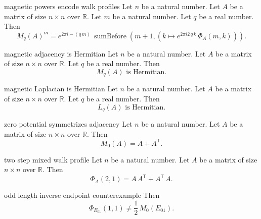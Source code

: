 \begin{cleanresult}{magnetic powers encode walk profiles}
Let $n$ be a natural number.
Let $A$ be a matrix of size $n\times n$ over $\mathbb{R}$.
Let $m$ be a natural number.
Let $q$ be a real number.
Then \[{M_{q}(A)}^{m} = e^{2\pi i -(q \, m)} \, \operatorname{sumBefore}(m + 1,\left(k \mapsto e^{2\pi i 2 \, q \, k} \, \Phi_{A}(m,k)\right)).\]
\par{}
\end{cleanresult}

\begin{cleanresult}{magnetic adjacency is Hermitian}
Let $n$ be a natural number.
Let $A$ be a matrix of size $n\times n$ over $\mathbb{R}$.
Let $q$ be a real number.
Then \[M_{q}(A)\text{ is Hermitian}.\]
\par{}
\end{cleanresult}

\begin{cleanresult}{magnetic Laplacian is Hermitian}
Let $n$ be a natural number.
Let $A$ be a matrix of size $n\times n$ over $\mathbb{R}$.
Let $q$ be a real number.
Then \[L_{q}(A)\text{ is Hermitian}.\]
\end{cleanresult}

\begin{cleanresult}{zero potential symmetrizes adjacency}
Let $n$ be a natural number.
Let $A$ be a matrix of size $n\times n$ over $\mathbb{R}$.
Then \[M_{0}(A) = A + A^{\mathsf{T}}.\]
\par{}
\end{cleanresult}

\begin{cleanresult}{two step mixed walk profile}
Let $n$ be a natural number.
Let $A$ be a matrix of size $n\times n$ over $\mathbb{R}$.
Then \[\Phi_{A}(2,1) = A \, A^{\mathsf{T}} + A^{\mathsf{T}} \, A.\]
\par{}
\end{cleanresult}

\begin{cleanresult}{odd length inverse endpoint counterexample}
Then \[\Phi_{E_{01}}(1,1) \ne \frac{1}{2} \, M_{0}(E_{01}).\]
\par{}
\end{cleanresult}
